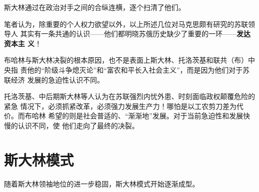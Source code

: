 斯大林通过在政治对手之间的合纵连横，逐个扫清了他们。

笔者认为，除重要的个人权力欲望以外，以上所述几位对马克思颇有研究的苏联领导人
其实有一条共通的认识——他们都明晓苏俄历史缺少了重要的一环——\textbf{发达资本主
  义}！

布哈林与斯大林决裂的根本原因，也不是表面上斯大林、托洛茨基和联共（布）中央指
责他的“阶级斗争熄灭论”和“富农和平长入社会主义”，而是因为他们对于苏联经济
发展的急迫性认识不同。

托洛茨基、中后期斯大林等人认为在苏联强烈内忧外患、时刻面临政权颠覆危险的紧急
情况下，必须抓紧改革，必须强力发展生产力！哪怕是以工农剪刀差为代价。而布哈林
希望的则是社会普适的、“渐渐地”发展。对于当前急迫性和发展快慢的认识不同，使
他们走向了最终的决裂。

\section{斯大林模式}

随着斯大林领袖地位的进一步稳固，斯大林模式开始逐渐成型。

